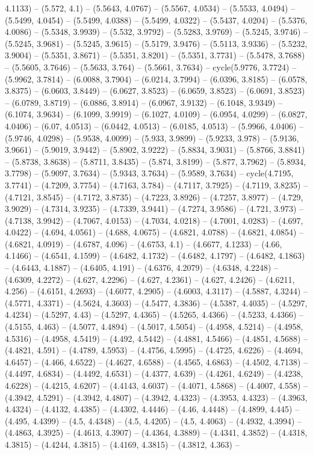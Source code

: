 4.1133) -- (5.572, 4.1) -- (5.5643, 4.0767) -- (5.5567, 4.0534) -- (5.5533, 4.0494) -- (5.5499, 4.0454) -- (5.5499, 4.0388) -- (5.5499, 4.0322) -- (5.5437, 4.0204) -- (5.5376, 4.0086) -- (5.5348, 3.9939) -- (5.532, 3.9792) -- (5.5283, 3.9769) -- (5.5245, 3.9746) -- (5.5245, 3.9681) -- (5.5245, 3.9615) -- (5.5179, 3.9476) -- (5.5113, 3.9336) -- (5.5232, 3.9004) -- (5.5351, 3.8671) -- (5.5351, 3.8201) -- (5.5351, 3.7731) -- (5.5478, 3.7688) -- (5.5605, 3.7646) -- (5.5633, 3.764) -- (5.5661, 3.7634) -- cycle(5.9776, 3.7724) -- (5.9962, 3.7814) -- (6.0088, 3.7904) -- (6.0214, 3.7994) -- (6.0396, 3.8185) -- (6.0578, 3.8375) -- (6.0603, 3.8449) -- (6.0627, 3.8523) -- (6.0659, 3.8523) -- (6.0691, 3.8523) -- (6.0789, 3.8719) -- (6.0886, 3.8914) -- (6.0967, 3.9132) -- (6.1048, 3.9349) -- (6.1074, 3.9634) -- (6.1099, 3.9919) -- (6.1027, 4.0109) -- (6.0954, 4.0299) -- (6.0827, 4.0406) -- (6.07, 4.0513) -- (6.0442, 4.0513) -- (6.0185, 4.0513) -- (5.9966, 4.0406) -- (5.9746, 4.0298) -- (5.9538, 4.0099) -- (5.933, 3.9899) -- (5.9233, 3.978) -- (5.9136, 3.9661) -- (5.9019, 3.9442) -- (5.8902, 3.9222) -- (5.8834, 3.9031) -- (5.8766, 3.8841) -- (5.8738, 3.8638) -- (5.8711, 3.8435) -- (5.874, 3.8199) -- (5.877, 3.7962) -- (5.8934, 3.7798) -- (5.9097, 3.7634) -- (5.9343, 3.7634) -- (5.9589, 3.7634) -- cycle(4.7195, 3.7741) -- (4.7209, 3.7754) -- (4.7163, 3.784) -- (4.7117, 3.7925) -- (4.7119, 3.8235) -- (4.7121, 3.8545) -- (4.7172, 3.8735) -- (4.7223, 3.8926) -- (4.7257, 3.8977) -- (4.729, 3.9029) -- (4.7314, 3.9235) -- (4.7339, 3.9441) -- (4.7274, 3.9586) -- (4.721, 3.973) -- (4.7138, 3.9942) -- (4.7067, 4.0153) -- (4.7034, 4.0218) -- (4.7001, 4.0283) -- (4.697, 4.0422) -- (4.694, 4.0561) -- (4.688, 4.0675) -- (4.6821, 4.0788) -- (4.6821, 4.0854) -- (4.6821, 4.0919) -- (4.6787, 4.096) -- (4.6753, 4.1) -- (4.6677, 4.1233) -- (4.66, 4.1466) -- (4.6541, 4.1599) -- (4.6482, 4.1732) -- (4.6482, 4.1797) -- (4.6482, 4.1863) -- (4.6443, 4.1887) -- (4.6405, 4.191) -- (4.6376, 4.2079) -- (4.6348, 4.2248) -- (4.6309, 4.2272) -- (4.627, 4.2296) -- (4.627, 4.2361) -- (4.627, 4.2426) -- (4.6211, 4.256) -- (4.6151, 4.2693) -- (4.6077, 4.2905) -- (4.6003, 4.3117) -- (4.5887, 4.3244) -- (4.5771, 4.3371) -- (4.5624, 4.3603) -- (4.5477, 4.3836) -- (4.5387, 4.4035) -- (4.5297, 4.4234) -- (4.5297, 4.43) -- (4.5297, 4.4365) -- (4.5265, 4.4366) -- (4.5233, 4.4366) -- (4.5155, 4.463) -- (4.5077, 4.4894) -- (4.5017, 4.5054) -- (4.4958, 4.5214) -- (4.4958, 4.5316) -- (4.4958, 4.5419) -- (4.492, 4.5442) -- (4.4881, 4.5466) -- (4.4851, 4.5688) -- (4.4821, 4.591) -- (4.4789, 4.5953) -- (4.4756, 4.5995) -- (4.4725, 4.6226) -- (4.4694, 4.6457) -- (4.466, 4.6522) -- (4.4627, 4.6588) -- (4.4565, 4.6863) -- (4.4502, 4.7138) -- (4.4497, 4.6834) -- (4.4492, 4.6531) -- (4.4377, 4.639) -- (4.4261, 4.6249) -- (4.4238, 4.6228) -- (4.4215, 4.6207) -- (4.4143, 4.6037) -- (4.4071, 4.5868) -- (4.4007, 4.558) -- (4.3942, 4.5291) -- (4.3942, 4.4807) -- (4.3942, 4.4323) -- (4.3953, 4.4323) -- (4.3963, 4.4324) -- (4.4132, 4.4385) -- (4.4302, 4.4446) -- (4.46, 4.4448) -- (4.4899, 4.445) -- (4.495, 4.4399) -- (4.5, 4.4348) -- (4.5, 4.4205) -- (4.5, 4.4063) -- (4.4932, 4.3994) -- (4.4863, 4.3925) -- (4.4613, 4.3907) -- (4.4364, 4.3889) -- (4.4341, 4.3852) -- (4.4318, 4.3815) -- (4.4244, 4.3815) -- (4.4169, 4.3815) -- (4.3812, 4.363) -- 